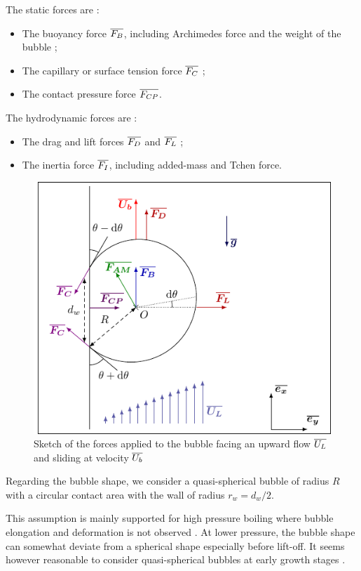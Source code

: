 \npar

The static forces are : 

\begin{itemize}
\item The buoyancy force $\overline{F_{B}}$, including Archimedes force and the weight of the bubble ;
\item The capillary or surface tension force $\overline{F_{C}}$ ;
\item The contact pressure force $\overline{F_{CP}}$.
\end{itemize}


The hydrodynamic forces are :

\begin{itemize}
\item The drag and lift forces $\overline{F_{D}}$ and $\overline{F_{L}}$ ;
\item The inertia force $\overline{F_{I}}$, including added-mass and Tchen force.
\end{itemize}



\begin{figure}[h!]
\centering
%
\includegraphics[width=0.6\linewidth]{img/bub_dyn/bub_bdf.pdf}
\caption{Sketch of the forces applied to the bubble facing an upward flow $\overline{U_{L}}$ and sliding at velocity $\overline{U_{b}}$}
\label{fig:bub_forces}
\end{figure}



Regarding the bubble shape, we consider a quasi-spherical bubble of radius $R$ with a circular contact area with the wall of radius $r_{w}=d_{w}/2$. 


\begin{remark*}{}
This assumption is mainly supported for high pressure boiling where bubble elongation and deformation is not observed \cite{kossolapov_experimental_2021}. At lower pressure, the bubble shape can somewhat deviate from a spherical shape especially before lift-off. It seems however reasonable to consider quasi-spherical bubbles at early growth stages \cite{maity_effect_2000}. 
\end{remark*} 


